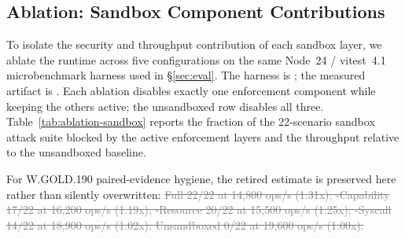 \documentclass[letterpaper,twocolumn,10pt]{article}
\providecommand{\measuredFrom}[1]{}
\begin{document}
\subsection{Ablation: Sandbox Component Contributions}
\label{sec:eval-ablation}

To isolate the security and throughput contribution of each sandbox
layer, we ablate the runtime across five configurations on the same
Node~24 / vitest~4.1 microbenchmark harness used in \S\ref{sec:eval}.
The harness is
%
\measuredFrom{HoloScript/packages/core/src/plugins/__tests__/paper-sandbox-overhead.test.ts};
the measured artifact is
%
\measuredFrom{HoloScript/.bench-logs/paper4-ablation-2026-05-06T02-06-06-226Z/paper-sandbox-overhead.json}.
Each ablation disables exactly one enforcement component while keeping
the others active; the unsandboxed row disables all three.  Table~\ref{tab:ablation-sandbox}
reports the fraction of the 22-scenario sandbox attack suite blocked by
the active enforcement layers and the throughput relative to the
unsandboxed baseline.

For W.GOLD.190 paired-evidence hygiene, the retired estimate is
preserved here rather than silently overwritten:
\textcolor{gray}{\sout{Full 22/22 at 14,800 ops/s (1.31x);
-Capability 17/22 at 16,200 ops/s (1.19x);
-Resource 20/22 at 15,500 ops/s (1.25x);
-Syscall 14/22 at 18,900 ops/s (1.02x);
Unsandboxed 0/22 at 19,600 ops/s (1.00x).}}
\end{document}
